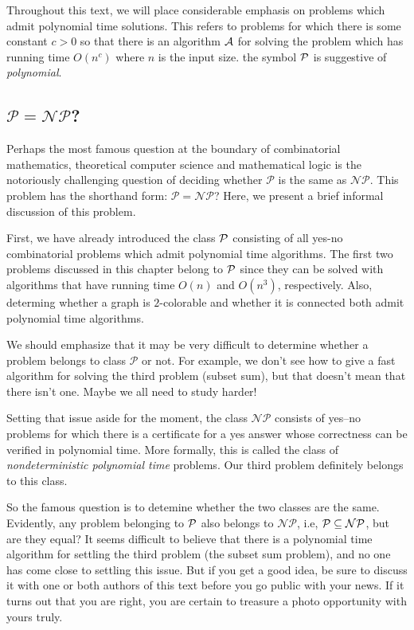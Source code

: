 Throughout this text, we will place considerable emphasis on
problems which admit polynomial time solutions.  This refers
to problems for which there is some constant $c>0$ so that there
is an algorithm $\mathcal{A}$ for solving the problem which has running
time $O(n^c)$ where $n$ is the input size.
the symbol $\mathcal{P}$ is suggestive of \textit{polynomial}.


\subsection{$\mathcal{P}=\mathcal{NP}$?}

Perhaps the most famous question at the boundary of
combinatorial mathematics, theoretical computer science
and mathematical logic is the notoriously challenging
question of deciding whether $\mathcal{P}$ is the same
as $\mathcal{NP}$.  This problem has the shorthand form:
$\mathcal{P}=\mathcal{NP}$?  Here, we present
a brief informal discussion of this problem.

First, we have already introduced the class $\mathcal{P}$ consisting of all 
yes-no combinatorial problems which admit polynomial time algorithms.
The first two problems discussed in this chapter belong to
$\mathcal{P}$ since they can be solved with algorithms that
have running time $O(n)$ and $O(n^3)$, respectively.
Also, determing whether a graph is $2$-colorable and whether it
is connected both admit polynomial time algorithms.  

We should emphasize that it may be very difficult to determine
whether a problem belongs to class $\mathcal{P}$ or not.
For example, we don't see how to give a fast algorithm for
solving the third problem (subset sum), but that doesn't mean
that there isn't one.  Maybe we all need to study harder!

Setting that issue aside for the moment, the class $\mathcal{NP}$ consists of
yes--no problems for which there is a certificate for
a yes answer whose correctness can be verified in polynomial
time. More formally, this is called the class of \textit{nondeterministic
polynomial time} problems.  Our third problem definitely belongs to this class.

So the famous question is to detemine whether the two
classes are the same.  Evidently, any problem belonging
to $\mathcal{P}$ also belongs to $\mathcal{NP}$, i.e,
$\mathcal{P}\subseteq\mathcal{NP}$, but are they equal?
It seems difficult to believe that there is a polynomial
time algorithm for settling the third problem (the subset
sum problem), and no one has come close to settling this
issue.  But if you get a good idea, be sure to discuss it with
one or both authors of this text before you go public with
your news.  If it turns out that you are right, you are
certain to treasure a photo opportunity with yours truly.

